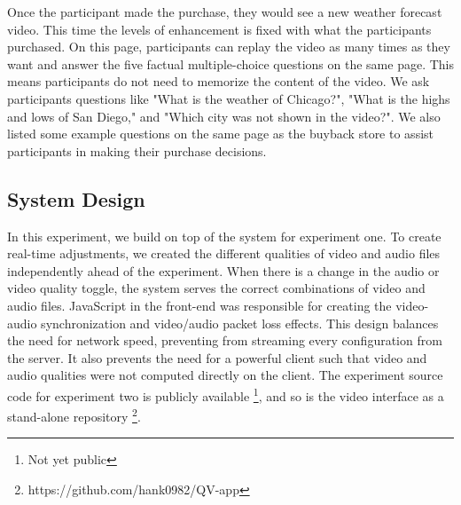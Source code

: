 Once the participant made the purchase, they would see a new weather forecast video. This time the levels of enhancement is fixed with what the participants purchased. On this page, participants can replay the video as many times as they want and answer the five factual multiple-choice questions on the same page. This means participants do not need to memorize the content of the video. We ask participants questions like "What is the weather of Chicago?", "What is the highs and lows of San Diego," and "Which city was not shown in the video?". 
We also listed some example questions on the same page as the buyback store to assist participants in making their purchase decisions. 

\subsection{System Design}
In this experiment, we build on top of the system for experiment one. To create real-time adjustments, we created the different qualities of video and audio files independently ahead of the experiment. When there is a change in the audio or video quality toggle, the system serves the correct combinations of video and audio files. JavaScript in the front-end was responsible for creating the video-audio synchronization and video/audio packet loss effects.
This design balances the need for network speed, preventing from streaming every configuration from the server. It also prevents the need for a powerful client such that video and audio qualities were not computed directly on the client. The experiment source code for experiment two is publicly available \footnote{Not yet public}, and so is the video interface as a stand-alone repository \footnote{https://github.com/hank0982/QV-app}.